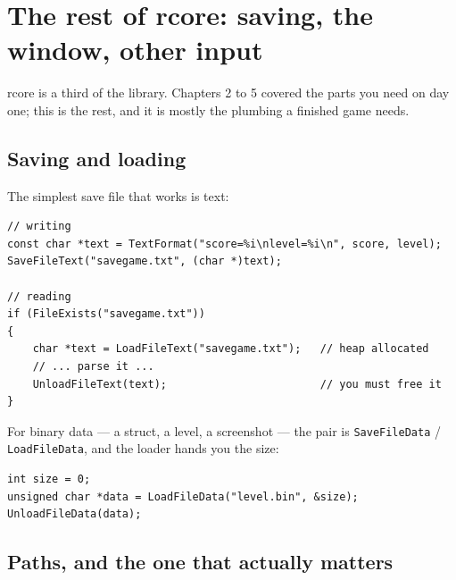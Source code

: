 \chapter{The rest of rcore: saving, the window, other input}

rcore is a third of the library. Chapters 2 to 5 covered the parts you need on
day one; this is the rest, and it is mostly the plumbing a finished game needs.

\section{Saving and loading}

The simplest save file that works is text:

\begin{lstlisting}
// writing
const char *text = TextFormat("score=%i\nlevel=%i\n", score, level);
SaveFileText("savegame.txt", (char *)text);

// reading
if (FileExists("savegame.txt"))
{
    char *text = LoadFileText("savegame.txt");   // heap allocated
    // ... parse it ...
    UnloadFileText(text);                        // you must free it
}
\end{lstlisting}

For binary data --- a struct, a level, a screenshot --- the pair is
\lstinline|SaveFileData| / \lstinline|LoadFileData|, and the loader hands you the
size:

\begin{lstlisting}
int size = 0;
unsigned char *data = LoadFileData("level.bin", &size);
UnloadFileData(data);
\end{lstlisting}


\section{Paths, and the one that actually matters}

